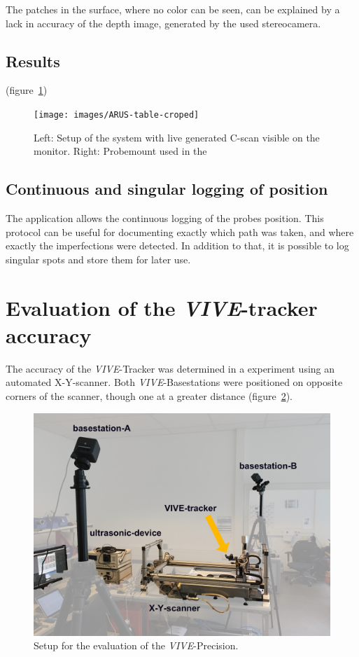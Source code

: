 \documentclass{VRARWorkshop}
\begin{document}
The patches in the surface, where no color can be seen, can be explained by a lack in accuracy of the depth image, generated by the used stereocamera.

\subsection{Results}

(figure~\ref{fig:AR-table})

\begin{figure}[h!]
    \begin{center}
        \texttt{[image: images/ARUS-table-croped]}
        \caption{\label{fig:AR-table} Left: Setup of the system with live generated C-scan visible on the monitor. Right: Probemount used in the }
    \end{center}
\end{figure}

\subsection{Continuous and singular logging of position}
The application allows the continuous logging of the probes position.
This protocol can be useful for documenting exactly which path was taken, and where exactly the imperfections were detected.
In addition to that, it is possible to log singular spots and store them for later use.

\section{Evaluation of the \textit{VIVE}-tracker accuracy}
The accuracy of the \textit{VIVE}-Tracker was determined in a experiment using an automated X-Y-scanner.
Both \textit{VIVE}-Basestations were positioned on opposite corners of the scanner, though one at a greater distance (figure~\ref{fig:precisionMeasurementSetup}).

\begin{figure}[h!]
    \begin{center}
        \includegraphics[width=120mm]{images/PrecisionMeasurement}
        \caption{\label{fig:precisionMeasurementSetup} Setup for the evaluation of the \textit{VIVE}-Precision.}
    \end{center}
\end{figure}
\end{document}
